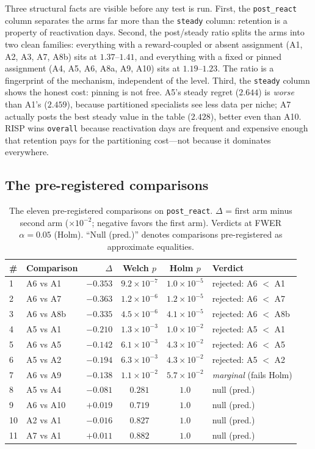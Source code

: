 Three structural facts are visible before any test is run. First, the
\texttt{post\_react} column separates the arms far more than the
\texttt{steady} column: retention is a property of reactivation days.
Second, the post/steady ratio splits the arms into two clean families:
everything with a reward-coupled or absent assignment (A1, A2, A3, A7, A8b)
sits at $1.37$--$1.41$, and everything with a fixed or pinned assignment
(A4, A5, A6, A8a, A9, A10) sits at $1.19$--$1.23$. The ratio is a
fingerprint of the mechanism, independent of the level. Third, the
\texttt{steady} column shows the honest cost: pinning is not free. A5's
steady regret ($2.644$) is \emph{worse} than A1's ($2.459$), because
partitioned specialists see less data per niche; A7 actually posts the best
steady value in the table ($2.428$), better even than A10. RISP wins
\texttt{overall} because reactivation days are frequent and expensive enough
that retention pays for the partitioning cost---not because it dominates
everywhere.

\subsection{The pre-registered comparisons}
\label{sec:dd5-e1-tests}

\begin{table}[h]
\centering
\caption{The eleven pre-registered comparisons on \texttt{post\_react}.
$\Delta$ = first arm minus second arm ($\times 10^{-2}$; negative favors the
first arm). Verdicts at FWER $\alpha = 0.05$ (Holm). ``Null (pred.)''
denotes comparisons pre-registered as approximate equalities.}
\label{tab:dd5-e1-tests}
\small
\begin{tabular}{llrccl}
\toprule
\# & Comparison & $\Delta$ & Welch $p$ & Holm $p$ & Verdict \\
\midrule
1 & A6 vs A1  & $-0.353$ & $9.2\times 10^{-7}$ & $1.0\times 10^{-5}$ & rejected: A6 $<$ A1 \\
2 & A6 vs A7  & $-0.363$ & $1.2\times 10^{-6}$ & $1.2\times 10^{-5}$ & rejected: A6 $<$ A7 \\
3 & A6 vs A8b & $-0.335$ & $4.5\times 10^{-6}$ & $4.1\times 10^{-5}$ & rejected: A6 $<$ A8b \\
4 & A5 vs A1  & $-0.210$ & $1.3\times 10^{-3}$ & $1.0\times 10^{-2}$ & rejected: A5 $<$ A1 \\
5 & A6 vs A5  & $-0.142$ & $6.1\times 10^{-3}$ & $4.3\times 10^{-2}$ & rejected: A6 $<$ A5 \\
6 & A5 vs A2  & $-0.194$ & $6.3\times 10^{-3}$ & $4.3\times 10^{-2}$ & rejected: A5 $<$ A2 \\
7 & A6 vs A9  & $-0.138$ & $1.1\times 10^{-2}$ & $5.7\times 10^{-2}$ & \emph{marginal} (fails Holm) \\
8 & A5 vs A4  & $-0.081$ & $0.281$ & $1.0$ & null (pred.) \\
9 & A6 vs A10 & $+0.019$ & $0.719$ & $1.0$ & null (pred.) \\
10 & A2 vs A1 & $-0.016$ & $0.827$ & $1.0$ & null (pred.) \\
11 & A7 vs A1 & $+0.011$ & $0.882$ & $1.0$ & null (pred.) \\
\bottomrule
\end{tabular}
\end{table}

